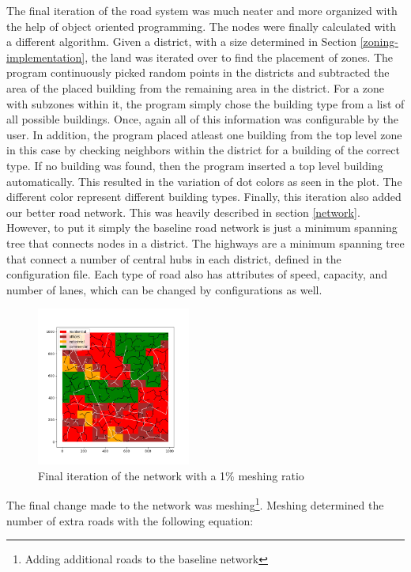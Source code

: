 \documentclass[11pt]{article}
\begin{document}
\begin{multicols}{2}
    \quad The final iteration of the road system was much neater and more organized with the help of object oriented programming. The nodes were finally calculated with a different algorithm. Given a district, with a size determined in Section \ref{zoning-implementation}, the land was iterated over to find the placement of zones. The program continuously picked random points in the districts and subtracted the area of the placed building from the remaining area in the district. For a zone with subzones within it, the program simply chose the building type from a list of all possible buildings. Once, again all of this information was configurable by the user. In addition, the program placed atleast one building from the top level zone in this case by checking neighbors within the district for a building of the correct type. If no building was found, then the program inserted a top level building automatically. This resulted in the variation of dot colors as seen in the plot. The different color represent different building types. Finally, this iteration also added our better road network. This was heavily described in section \ref{network}. However, to put it simply the baseline road network is just a minimum spanning tree that connects nodes in a district. The highways are a minimum spanning tree that connect a number of central hubs in each district, defined in the configuration file. Each type of road also has attributes of speed, capacity, and number of lanes, which can be changed by configurations as well. 

    \begin{figure}[H]
        \centering
        \includegraphics[width=0.45\textwidth]{images/meshednetwork.png}
        \caption{Final iteration of the network with a 1\% meshing ratio}
        \label{fig:final-meshed-network}
    \end{figure}

    \quad The final change made to the network was meshing\footnote{Adding additional roads to the baseline network}. Meshing determined the number of extra roads with the following equation:


\end{multicols}
\end{document}
